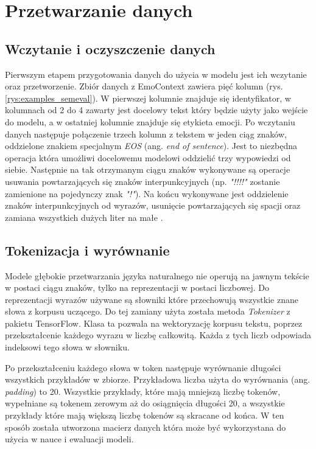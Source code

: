 \chapter{Przetwarzanie danych}

\section{Wczytanie i oczyszczenie danych}

Pierwszym etapem przygotowania danych do użycia w modelu jest ich wczytanie oraz przetworzenie. Zbiór danych z EmoContext zawiera pięć kolumn (rys. \ref{rys:examples_semeval}). W pierwszej kolumnie znajduje się identyfikator, w kolumnach od 2 do 4 zawarty jest docelowy tekst który będzie użyty jako wejście do modelu, a w ostatniej kolumnie znajduje się etykieta emocji. Po wczytaniu danych następuje połączenie trzech kolumn z tekstem w jeden ciąg znaków, oddzielone znakiem specjalnym \textit{EOS} (ang. \textit{end of sentence}). Jest to niezbędna operacja która umożliwi docelowemu modelowi oddzielić trzy wypowiedzi od siebie. Następnie na tak otrzymanym ciągu znaków wykonywane są operacje usuwania powtarzających się znaków interpunkcyjnych (np. \textit{"!!!!"} zostanie zamienione na pojedynczy znak \textit{"!"}). Na końcu wykonywane jest oddzielenie znaków interpunkcyjnych od wyrazów, usunięcie powtarzających się spacji oraz zamiana wszystkich dużych liter na małe .

\section{Tokenizacja i wyrównanie}

Modele głębokie przetwarzania języka naturalnego nie operują na jawnym tekście w postaci ciągu znaków, tylko na reprezentacji w postaci liczbowej. Do reprezentacji wyrazów używane są słowniki które przechowują wszystkie znane słowa z korpusu uczącego. Do tej zamiany użyta została metoda \textit{Tokenizer} z pakietu TensorFlow. Klasa ta pozwala na wektoryzację korpusu tekstu, poprzez przekształcenie każdego wyrazu w liczbę całkowitą. Każda z tych liczb odpowiada indeksowi tego słowa w słowniku.

Po przekształceniu każdego słowa w token następuje wyrównanie długości wszystkich przykładów w zbiorze. Przykładowa liczba użyta do wyrównania (ang. \textit{padding}) to 20. Wszystkie przykłady, które mają mniejszą liczbę tokenów, wypełniane są tokenem zerowym aż do osiągnięcia długości 20, a wszystkie przykłady które mają większą liczbę tokenów są skracane od końca. W ten sposób została utworzona macierz danych która może być wykorzystana do użycia w nauce i ewaluacji modeli.

